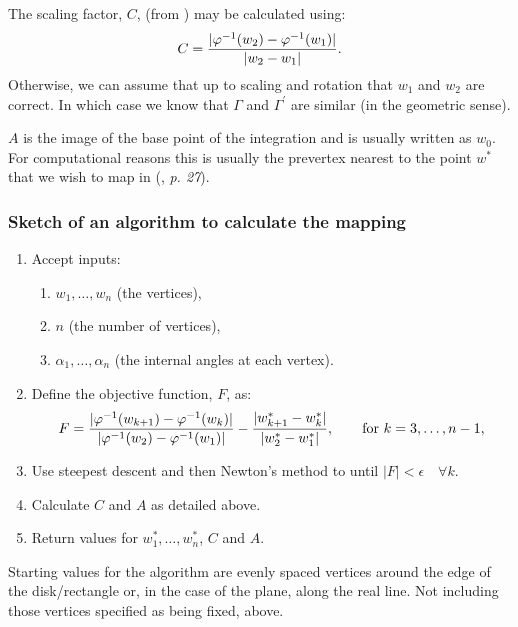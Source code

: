 The scaling factor, $C$, (from ) may be calculated using:
\begin{equation}
C=\frac{\vert \varphi^{-1}(w_2)-\varphi^{-1}(w_1)\vert}{\vert w_2 - w_1\vert}.
\end{equation}
Otherwise, we can assume that up to scaling and rotation that $w_1$ and $w_2$ are correct. In which case we know that $\Gamma$ and $\Gamma^\prime$ are similar (in the geometric sense). 

$A$ is the image of the base point of the integration and is usually written as $w_0$. For computational reasons this is usually the prevertex nearest to the point $w^*$ that we wish to map in   (\cite{driscoll}, \emph{p. 27}).


\subsubsection{Sketch of an algorithm to calculate the \sch mapping}
\label{algorithmsketch}
\begin{enumerate}
\item Accept inputs:
   \begin{enumerate} 
      \item $w_1,\dots,w_n$ (the vertices),
      \item $n$ (the number of vertices),
      \item $\alpha_1,\dots,\alpha_n$ (the internal angles at each vertex).
   \end{enumerate}
\item Define the objective function, $F$, as:
 \begin{equation*}
F=\frac{\vert \varphi^{-1}(w_{k+1}) -  \varphi^{-1}(w_k) \vert}{\vert \varphi^{-1}(w_2)-\varphi^{-1}(w_1)\vert} - \frac{\vert w^*_{k+1} - w^*_k\vert}{\vert w^*_2 - w^*_1\vert}, \qquad \text{for } k=3,\dots,n-1,
 \end{equation*}
\item Use steepest descent and then Newton's method to until $\vert F\vert < \epsilon \quad \forall k$. \item Calculate $C$ and $A$ as detailed above.
\item Return values for $w^*_1,\dots,w^*_n$, $C$ and $A$.
\end{enumerate}

Starting values for the algorithm are evenly spaced vertices around the edge of the disk/rectangle or, in the case of the plane, along the real line. Not including those vertices specified as being fixed, above.

